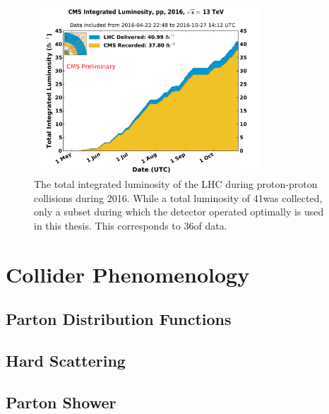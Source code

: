\begin{figure}[htbp]
  \centering
  \includegraphics[width=0.75\textwidth]{Collider/Figures/lumi_2016.pdf}
  \caption{
    The total integrated luminosity of the LHC during proton-proton collisions during 2016.\cite{}
    While a total luminosity of 41\fbinv was collected, only a subset during which the detector operated optimally is used in this thesis. This corresponds to 36\fbinv of data.
  }
  \label{fig:lumi}
\end{figure}

\section{Collider Phenomenology}

\subsection{Parton Distribution Functions}

\subsection{Hard Scattering}

\subsection{Parton Shower}
